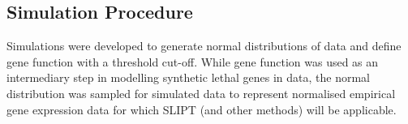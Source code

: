 \FloatBarrier

\subsection{Simulation Procedure} \label{methods:simulating_SL}

Simulations were developed to generate normal distributions of  data and define gene function with a threshold cut-off. 
While gene function was used as an intermediary step in modelling \gls{synthetic lethal} genes in  data, the normal distribution was sampled for simulated data to represent normalised empirical \gls{gene expression} data for which \gls{SLIPT} (and other methods) will be applicable.

